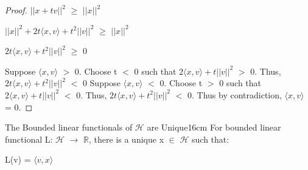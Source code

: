 \begin{proof}
        \hspace{0.5cm}
        $||x+tv||^2$ $\geq$ $||x||^2$

        \hspace{0.5cm}
        $||x||^2 + 2t \langle x , v \rangle + t^2 ||v||^2$ $\geq$ $||x||^2$

        \hspace{0.5cm}
        $2t \langle x , v \rangle + t^2 ||v||^2$ $\geq$ 0

        Suppose $\langle x , v \rangle$ $>$ 0. Choose t $<$ 0
        such that $2 \langle x , v \rangle + t ||v||^2$ $>$ 0.
        Thus, $2t \langle x , v \rangle + t^2 ||v||^2$ $<$ 0
        Suppose $\langle x , v \rangle$ $<$ 0. Choose t $>$ 0
        such that $2 \langle x , v \rangle + t ||v||^2$ $<$ 0.
        Thus, $2t \langle x , v \rangle + t^2 ||v||^2$ $<$ 0.
        Thus by contradiction, $\langle x , v \rangle$ = 0.
    \end{proof}

    \vspace{0.5cm}



    \begin{wtheorem}{The Bounded linear functionals of $\mathcal{H}$
    are Unique}{16cm}
        For bounded linear functional L: $\mathcal{H}$ $\rightarrow$ $\mathbb{R}$,
        there is a unique x $\in$ $\mathcal{H}$ such that:

        \hspace{0.5cm}
        L(v) = $\langle v , x \rangle$
    \end{wtheorem}

